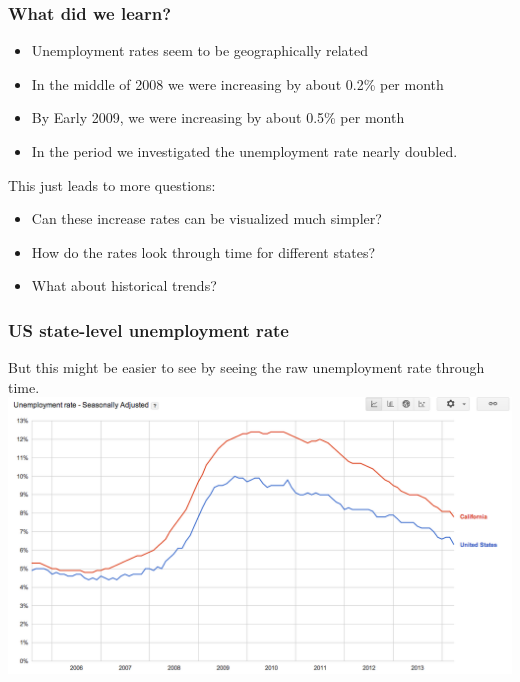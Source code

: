 \documentclass{beamer} %
\newcommand{\1}{\mathbb{1}}
\begin{document}
{				\begin{frame}[t]\frametitle{What did we learn?}
					\begin{itemize}
						\item Unemployment rates seem to be geographically related
						\item In the middle of 2008 we were increasing by about 0.2\% per month
						\item By Early 2009, we were increasing by about 0.5\% per month
						\item In the period we investigated the unemployment rate nearly doubled.
					\end{itemize}
					This just leads to more questions:
					\begin{itemize}
						\item Can these increase rates can be visualized much simpler?
						\item How do the rates look through time for different states?
						\item What about historical trends?
					\end{itemize}

				\end{frame}


				\begin{frame}[t]\frametitle{US state-level unemployment rate}
				But this might be easier to see by seeing the raw unemployment rate through time. 
				\\
				\includegraphics[scale = 0.29]{./visualization/unemployment_trend.png}
				\end{frame}


}
\end{document}
